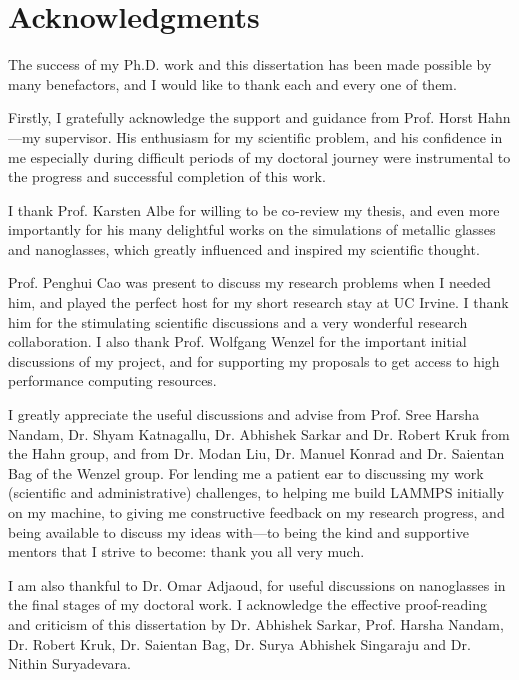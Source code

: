 \chapter{Acknowledgments} \label{c:ack}
The success of my Ph.D. work and this dissertation has been made possible by many benefactors, and I would like to thank each and every one of them. \par

Firstly, I gratefully acknowledge the support and guidance from Prof. Horst Hahn---my supervisor. His enthusiasm for my scientific problem, and his confidence in me especially during difficult periods of my doctoral journey were instrumental to the progress and successful completion of this work. \par

I thank Prof. Karsten Albe for willing to be co-review my thesis, and even more importantly for his many delightful works on the simulations of metallic glasses and nanoglasses, which greatly influenced and inspired my scientific thought. \par

Prof. Penghui Cao was present to discuss my research problems when I needed him, and played the perfect host for my short research stay at UC Irvine. I thank him for the stimulating scientific discussions and a very wonderful research collaboration. I also thank Prof. Wolfgang Wenzel for the important initial discussions of my project, and for supporting my proposals to get access to high performance computing resources. \par

I greatly appreciate the useful discussions and advise from Prof. Sree Harsha Nandam, Dr. Shyam Katnagallu, Dr. Abhishek Sarkar and Dr. Robert Kruk from the Hahn group, and from Dr. Modan Liu, Dr. Manuel Konrad and Dr. Saientan Bag of the Wenzel group. For lending me a patient ear to discussing my work (scientific and administrative) challenges, to helping me build LAMMPS initially on my machine, to giving me constructive feedback on my research progress, and being available to discuss my ideas with---to being the kind and supportive mentors that I strive to become: thank you all very much. \par

I am also thankful to Dr. Omar Adjaoud, for useful discussions on nanoglasses in the final stages of my doctoral work. I acknowledge the effective proof-reading and criticism of this dissertation by Dr. Abhishek Sarkar, Prof. Harsha Nandam, Dr. Robert Kruk, Dr. Saientan Bag, Dr. Surya Abhishek Singaraju and Dr. Nithin Suryadevara. \par

